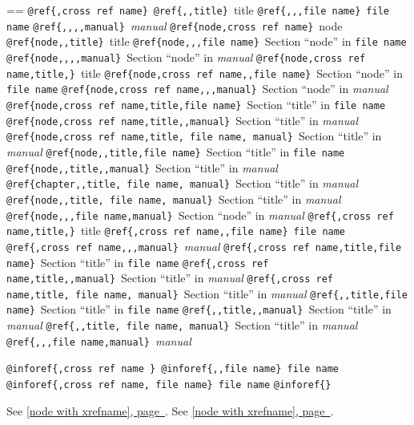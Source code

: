 \documentclass{book}
\makeatletter
\newenvironment{Texinfopreformatted}{%
  \par\GNUTobeylines\obeyspaces\frenchspacing\parskip=\z@\parindent=\z@}{}
{\catcode`\^^M=13 \gdef\GNUTobeylines{\catcode`\^^M=13 \def^^M{\null\par}}}
\newenvironment{Texinfoindented}{\begin{list}{}{}\item\relax}{\end{list}}
\renewcommand{\_}{\Texinfounderscore\discretionary{}{}{}}
\makeatother
\begin{document}
\begin{Texinfoindented}
\begin{Texinfopreformatted}
\texttt{@ref\{,cross ref name\}}\ 
\texttt{@ref\{{,}{,}title\}}\ title
\texttt{@ref\{{,}{,},file name\}}\ \texttt{file name}
\texttt{@ref\{{,}{,}{,}{,}manual\}}\ \textsl{manual}
\texttt{@ref\{node,cross ref name\}}\ node
\texttt{@ref\{node{,}{,}title\}}\ title
\texttt{@ref\{node{,}{,},file name\}}\ Section ``node'' in \texttt{file name}
\texttt{@ref\{node{,}{,}{,}{,}manual\}}\ Section ``node'' in \textsl{manual}
\texttt{@ref\{node,cross ref name,title,\}}\ title
\texttt{@ref\{node,cross ref name{,}{,}file name\}}\ Section ``node'' in \texttt{file name}
\texttt{@ref\{node,cross ref name{,}{,},manual\}}\ Section ``node'' in \textsl{manual}
\texttt{@ref\{node,cross ref name,title,file name\}}\ Section ``title'' in \texttt{file name}
\texttt{@ref\{node,cross ref name,title{,}{,}manual\}}\ Section ``title'' in \textsl{manual}
\texttt{@ref\{node,cross ref name,title,\ file name,\ manual\}}\ Section ``title'' in \textsl{manual}
\texttt{@ref\{node{,}{,}title,file name\}}\ Section ``title'' in \texttt{file name}
\texttt{@ref\{node{,}{,}title{,}{,}manual\}}\ Section ``title'' in \textsl{manual}
\texttt{@ref\{chapter{,}{,}title,\ file name,\ manual\}}\ Section ``title'' in \textsl{manual}
\texttt{@ref\{node{,}{,}title,\ file name,\ manual\}}\ Section ``title'' in \textsl{manual}
\texttt{@ref\{node{,}{,},file name,manual\}}\ Section ``node'' in \textsl{manual}
\texttt{@ref\{,cross ref name,title,\}}\ title
\texttt{@ref\{,cross ref name{,}{,}file name\}}\ \texttt{file name}
\texttt{@ref\{,cross ref name{,}{,},manual\}}\ \textsl{manual}
\texttt{@ref\{,cross ref name,title,file name\}}\ Section ``title'' in \texttt{file name}
\texttt{@ref\{,cross ref name,title{,}{,}manual\}}\ Section ``title'' in \textsl{manual}
\texttt{@ref\{,cross ref name,title,\ file name,\ manual\}}\ Section ``title'' in \textsl{manual}
\texttt{@ref\{{,}{,}title,file name\}}\ Section ``title'' in \texttt{file name}
\texttt{@ref\{{,}{,}title{,}{,}manual\}}\ Section ``title'' in \textsl{manual}
\texttt{@ref\{{,}{,}title,\ file name,\ manual\}}\ Section ``title'' in \textsl{manual}
\texttt{@ref\{{,}{,},file name,manual\}}\ \textsl{manual}

\texttt{@inforef\{,cross ref name \}}\ 
\texttt{@inforef\{{,}{,}file name\}}\ \texttt{file name}
\texttt{@inforef\{,cross ref name,\ file name\}}\ \texttt{file name}
\texttt{@inforef\{\}}\ 


\end{Texinfopreformatted}
\end{Texinfoindented}


See \hyperref[anchor:node-with-xrefname]{[node with xrefname], page~\pageref*{anchor:node-with-xrefname}}.
See \hyperref[anchor:node-with-xrefname]{[node with xrefname], page~\pageref*{anchor:node-with-xrefname}}.
\end{document}
